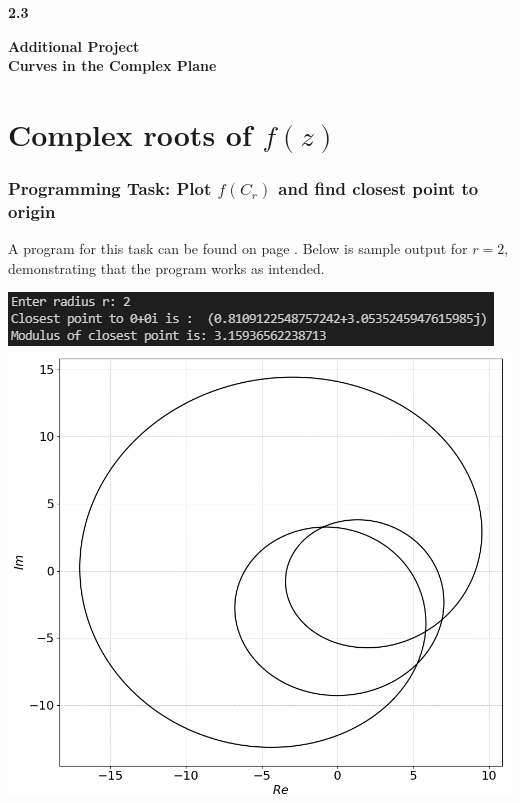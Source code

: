 \documentclass[12pt, a4paper]{article}
\begin{document}
	
\setlength{\parindent}{0pt}
\captionsetup{justification=centering}
\lstset{
	showstringspaces=false
}


\begin{titlepage}
	\Huge
	\textbf{2.3}
	\begin{center}
		\vspace*{7cm}
		
		\Huge
		\textbf{Additional Project \\ Curves in the Complex Plane}
		
		\vspace{0.5cm}
	\end{center}
\end{titlepage}

\section{Complex roots of $f(z)$}

\subsubsection*{Programming Task: Plot $f(C_{r})$ and find closest point to origin}

A program for this task can be found on page \pageref{programmingtask1}. 
Below is sample output for $r = 2$, demonstrating that the program works as intended.

\vspace{0.4cm}
\begin{minipage}{\textwidth}
	\centering
	\includegraphics[width=0.75\linewidth]{ProgTask1_results}
	\vspace{0.4cm}\\
	\includegraphics[width=0.75\linewidth]{ProgTask1_fig}
\end{minipage}
\end{document}
